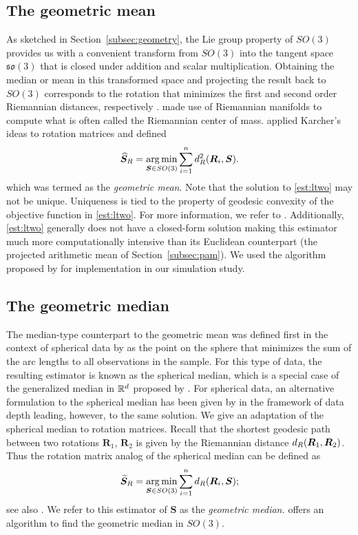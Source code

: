 \subsection{The geometric mean}
\label{section:ltwo}
As sketched in Section~\ref{subsec:geometry}, the Lie group property of $SO(3)$ provides us with a convenient transform from $SO(3)$
into the tangent space $\mathfrak{so}(3)$ that is closed under
addition and scalar multiplication.  Obtaining the median or mean
in this transformed space and projecting the result back to $SO(3)$ corresponds to the rotation that minimizes the first and second order Riemannian
distances, respectively \citep{karcher77, moakher02, fletcher08, fletcher09}.  \citet{karcher77} made use of Riemannian manifolds to compute what is often called the Riemannian
center of mass.  \citet{moakher02} applied Karcher's ideas to
rotation matrices and defined
\begin{equation}\label{est:ltwo}
{\widehat{\bm S}_R}=\operatorname*{arg\,min}_{\bm{S}\in
SO(3)}\sum_{i=1}^n d^2_{R}(\bm{R}_i,\bm{S}).
\end{equation}
which was termed as the \textit{geometric mean}.  Note that the solution to  \eqref{est:ltwo} may not be
unique. Uniqueness is tied to the property of geodesic convexity of the objective function in \eqref{est:ltwo}. For more information, we refer to \citet{moakher02}.  Additionally, \eqref{est:ltwo} generally does not have a closed-form solution making this estimator much more computationally intensive than its Euclidean counterpart (the projected arithmetic mean of Section~\ref{subsec:pam}).  We used the algorithm proposed by \citet{manton04} for implementation in our simulation study.

\subsection{The geometric median}
\label{subsec:lone}
The median-type counterpart to the geometric mean was defined first in the context of
spherical data by \citet{fisher85} as the point on the sphere that minimizes the sum of the arc lengths to all
observations in the sample.   For this type of data, the resulting estimator is known as the spherical median,
 which is a special case of the generalized median in ${\mathbb{R}}^d$
proposed by \citet{gower74}.   For spherical data, an alternative formulation to the
spherical median has been given by \citet{liu92} in the framework of
data depth leading, however, to the same solution. We give an adaptation of the spherical median to rotation matrices. 
Recall that the shortest geodesic path between two rotations ${\bm R_1}$, ${\bm R_2}$ is given by the Riemannian distance ${d_R}(\bm R_1,\bm R_2)$.  Thus the rotation matrix analog of the \cite{fisher85} spherical
median can be defined as
\begin{equation*}
{\widetilde{\bm S}_R}=\operatorname*{arg\,min}_{\bm{S}\in
SO(3)}\sum_{i=1}^n{d_R}(\bm{R}_i,\bm{S});
\end{equation*}
see also \cite{fletcher08, fletcher09}.  We refer to this estimator of $\bm{S}$ as the \textit{geometric median.}  \citet{hartley11} offers an algorithm to find the geometric median in $SO(3)$.

